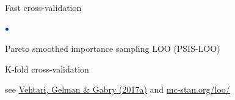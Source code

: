 \documentclass[english,t]{beamer}
\newenvironment{list1}{
   \begin{list}{$\color{list1}\bullet$}{\itemsep=6pt}}{
  \end{list}}
\begin{document}
\begin{frame}{}

{\Large\color{navyblue} Fast cross-validation}

\begin{list1}
\item Pareto smoothed importance sampling LOO (PSIS-LOO)
\item K-fold cross-validation
\end{list1}

\vspace{12\baselineskip}

{\small see \href{http://link.springer.com/article/10.1007/s11222-016-9696-4}{Vehtari, Gelman \& Gabry (2017a)} and \url{mc-stan.org/loo/}}

\end{frame}
\end{document}
